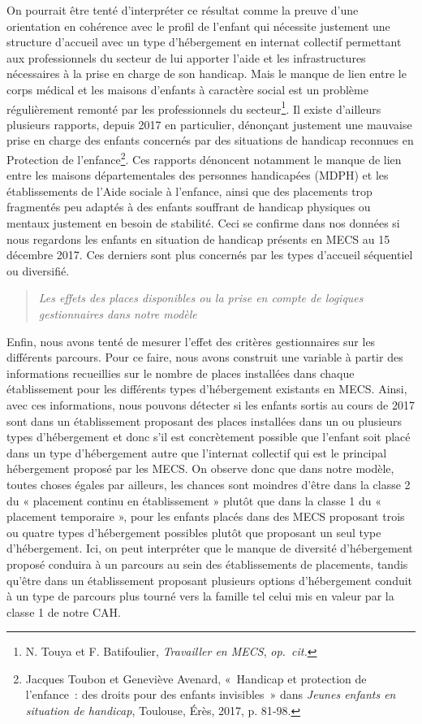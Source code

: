 \documentclass[
  12,
  a4paper,
]{report}
\begin{document}
On pourrait être tenté d'interpréter ce résultat comme la preuve d'une
orientation en cohérence avec le profil de l'enfant qui nécessite
justement une structure d'accueil avec un type d'hébergement en internat
collectif permettant aux professionnels du secteur de lui apporter
l'aide et les infrastructures nécessaires à la prise en charge de son
handicap. Mais le manque de lien entre le corps médical et les maisons
d'enfants à caractère social est un problème régulièrement remonté par
les professionnels du secteur\footnote{N. Touya et F. Batifoulier,
  \emph{Travailler en MECS}, \emph{op.~cit.}}. Il existe d'ailleurs
plusieurs rapports, depuis 2017 en particulier, dénonçant justement une
mauvaise prise en charge des enfants concernés par des situations de
handicap reconnues en Protection de l'enfance\footnote{Jacques Toubon et
  Geneviève Avenard, {«~Handicap et protection de l'enfance~: des droits
  pour des enfants invisibles~»} dans \emph{Jeunes enfants en situation
  de handicap}, {Toulouse}, {Érès}, 2017, p. 81‑98.}. Ces rapports
dénoncent notamment le manque de lien entre les maisons départementales
des personnes handicapées (MDPH) et les établissements de l'Aide sociale
à l'enfance, ainsi que des placements trop fragmentés peu adaptés à des
enfants souffrant de handicap physiques ou mentaux justement en besoin
de stabilité. Ceci se confirme dans nos données si nous regardons les
enfants en situation de handicap présents en MECS au 15 décembre 2017.
Ces derniers sont plus concernés par les types d'accueil séquentiel ou
diversifié.

\begin{quote}
\emph{Les effets des places disponibles ou la prise en compte de
logiques gestionnaires dans notre modèle}
\end{quote}

Enfin, nous avons tenté de mesurer l'effet des critères gestionnaires
sur les différents parcours. Pour ce faire, nous avons construit une
variable à partir des informations recueillies sur le nombre de places
installées dans chaque établissement pour les différents types
d'hébergement existants en MECS. Ainsi, avec ces informations, nous
pouvons détecter si les enfants sortis au cours de 2017 sont dans un
établissement proposant des places installées dans un ou plusieurs types
d'hébergement et donc s'il est concrètement possible que l'enfant soit
placé dans un type d'hébergement autre que l'internat collectif qui est
le principal hébergement proposé par les MECS. On observe donc que dans
notre modèle, toutes choses égales par ailleurs, les chances sont
moindres d'être dans la classe 2 du « placement continu en établissement
» plutôt que dans la classe 1 du « placement temporaire », pour les
enfants placés dans des MECS proposant trois ou quatre types
d'hébergement possibles plutôt que proposant un seul type d'hébergement.
Ici, on peut interpréter que le manque de diversité d'hébergement
proposé conduira à un parcours au sein des établissements de placements,
tandis qu'être dans un établissement proposant plusieurs options
d'hébergement conduit à un type de parcours plus tourné vers la famille
tel celui mis en valeur par la classe 1 de notre CAH.
\end{document}

